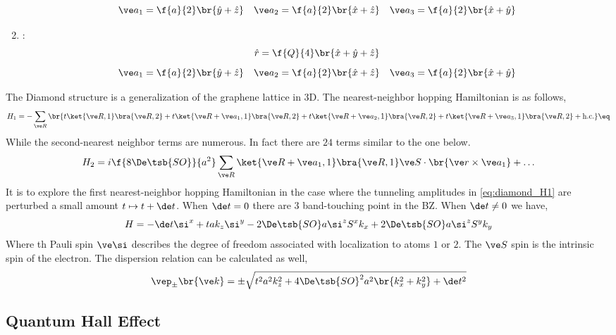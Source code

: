 \documentclass{article}
\begin{document}
\begin{enumerate}
\begin{center}
    \end{center}
    \[ \ve a_1 = \f{a}{2} \br{\hat y + \hat z} \quad \ve a_2 = \f{a}{2} \br{\hat x + \hat z} \quad \ve a_3 = \f{a}{2} \br{\hat x + \hat y} \]
    \item {}:
    \[ \hat r = \f{Q}{4}\br{\hat x + \hat y + \hat z} \]
    \[ \ve a_1 = \f{a}{2} \br{\hat y + \hat z} \quad \ve a_2 = \f{a}{2} \br{\hat x + \hat z} \quad \ve a_3 = \f{a}{2} \br{\hat x + \hat y} \]
\end{enumerate}

The Diamond structure is a generalization of the graphene lattice in 3D. The nearest-neighbor hopping Hamiltonian is as follows,
\[ H_1 = - \sum_{\ve R} \br{t \ket{\ve R, 1}\bra{\ve R, 2} + t \ket{\ve R + \ve a_1, 1}\bra{\ve R, 2} + t \ket{\ve R + \ve a_2, 1}\bra{\ve R, 2} + t \ket{\ve R + \ve a_3, 1} \bra{\ve R, 2} + \text{h.c.}} \eq \label{eq:diamond_H1}\]
While the second-nearest neighbor terms are numerous. In fact there are $24$ terms similar to the one below.
\[ H_2 = i \f{8 \De\tsb{SO}}{a^2} \sum_{\ve R} \ket{\ve R + \ve a_1,1} \bra{\ve R, 1} \ve S \cdot \br{\ve r \times \ve a_1} + \ldots \]
It is to explore the first nearest-neighbor hopping Hamiltonian in the case where the tunneling amplitudes in \cref{eq:diamond_H1} are perturbed a small amount $t \mapsto t + \de t$. When $\de t = 0$ there are $3$ band-touching point in the BZ. When $\de t \neq 0$ we have,
\[ H = - \de t \si^{x} + t a k_z \si^{y} - 2 \De\tsb{SO} a \si^{z} S^{x} k_x + 2 \De\tsb{SO} a \si^{z} S^{y} k_y \]
Where th Pauli spin $\ve \si$ describes the degree of freedom associated with localization to atoms $1$ or $2$. The $\ve S$ spin is the intrinsic spin of the electron. The dispersion relation can be calculated as well,
\[ \vep_{\pm}\br{\ve k} = \pm \sqrt{t^2 a^2 k_z^2 + 4 \De\tsb{SO}^2 a^2 \br{k_x^2 + k_y^2} + \de t^2} \]

\subsection{Quantum Hall Effect}
\end{document}
